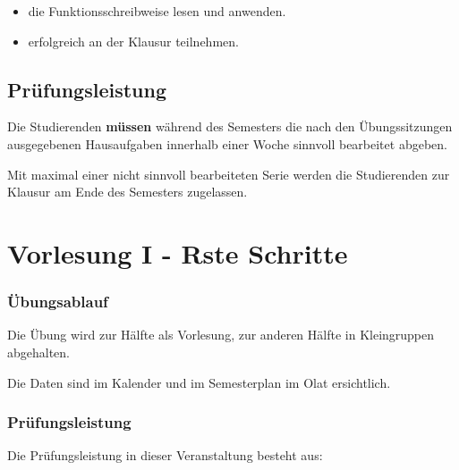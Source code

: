 \documentclass[
]{book}
\providecommand{\tightlist}{%
  \setlength{\itemsep}{0pt}\setlength{\parskip}{0pt}}
\begin{document}
\begin{itemize}
\tightlist
\item
  die Funktionsschreibweise lesen und anwenden.
\item
  erfolgreich an der Klausur teilnehmen.
\end{itemize}

\hypertarget{pruxfcfungsleistung}{%
\section{Prüfungsleistung}\label{pruxfcfungsleistung}}

Die Studierenden \textbf{müssen} während des Semesters die nach den Übungssitzungen ausgegebenen Hausaufgaben innerhalb einer Woche sinnvoll bearbeitet abgeben.

Mit maximal einer nicht sinnvoll bearbeiteten Serie werden die Studierenden zur Klausur am Ende des Semesters zugelassen.

\hypertarget{vorlesung-i---rste-schritte}{%
\chapter{Vorlesung I - Rste Schritte}\label{vorlesung-i---rste-schritte}}

\hypertarget{uxfcbungsablauf}{%
\subsection*{Übungsablauf}\label{uxfcbungsablauf}}

Die Übung wird zur Hälfte als Vorlesung, zur anderen Hälfte in Kleingruppen abgehalten.

Die Daten sind im Kalender und im Semesterplan im Olat ersichtlich.

\hypertarget{pruxfcfungsleistung-1}{%
\subsection*{Prüfungsleistung}\label{pruxfcfungsleistung-1}}

Die Prüfungsleistung in dieser Veranstaltung besteht aus:
\end{document}
